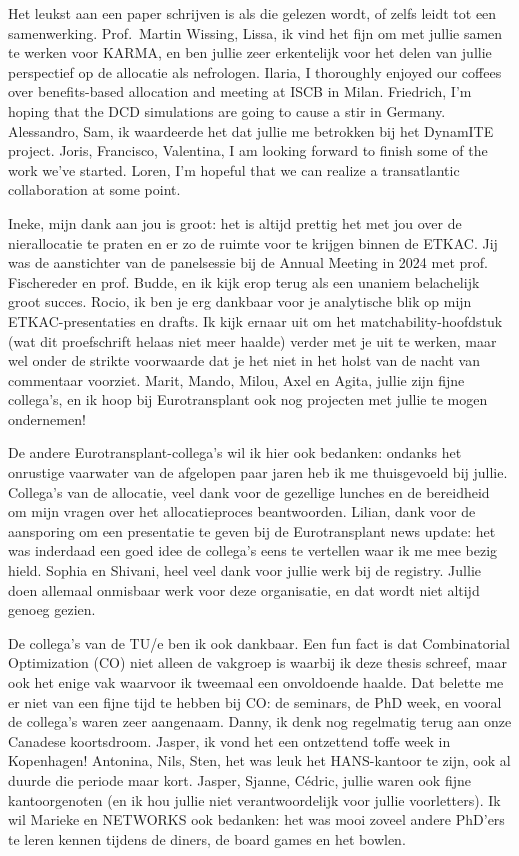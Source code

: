 \documentclass[11pt,twoside,]{book}
\begin{document}
Het leukst aan een paper schrijven is als die gelezen wordt, of zelfs
leidt tot een samenwerking. Prof.~Martin Wissing, Lissa,
ik vind het fijn om met jullie samen te werken voor KARMA, en ben jullie
zeer erkentelijk voor het delen van jullie perspectief op de allocatie als nefrologen.
Ilaria, I thoroughly enjoyed our coffees over benefits-based allocation and meeting
at ISCB in Milan. Friedrich, I'm hoping that the DCD simulations are going to
cause a stir in Germany. Alessandro, Sam, ik waardeerde het dat jullie me betrokken
bij het DynamITE project. Joris, Francisco, Valentina, I am looking forward to finish some
of the work we've started. Loren, I'm hopeful that we can
realize a transatlantic collaboration at some point.

Ineke, mijn dank aan jou is groot: het is altijd prettig het met jou over
de nierallocatie te praten en er zo de ruimte voor te krijgen binnen de ETKAC.
Jij was de aanstichter van de panelsessie bij de Annual Meeting in 2024 met
prof. Fischereder en prof. Budde, en ik kijk erop terug als een unaniem belachelijk
groot succes. Rocio, ik ben je erg dankbaar voor je analytische blik op
mijn ETKAC-presentaties en drafts. Ik kijk ernaar uit om het matchability-hoofdstuk
(wat dit proefschrift helaas niet meer haalde) verder met je uit te werken,
maar wel onder de strikte voorwaarde dat je het niet in het holst van de nacht
van commentaar voorziet.
Marit, Mando, Milou, Axel en Agita, jullie zijn fijne collega's, en ik hoop bij
Eurotransplant ook nog projecten met jullie te mogen ondernemen!

\newpage
De andere Eurotransplant-collega's wil ik hier ook bedanken: ondanks
het onrustige vaarwater van de afgelopen paar jaren heb ik me thuisgevoeld bij
jullie. Collega's van de allocatie, veel dank voor de gezellige lunches
en de bereidheid om mijn vragen over het allocatieproces beantwoorden. Lilian, dank
voor de aansporing om een presentatie te geven bij de Eurotransplant news update:
het was inderdaad een goed idee de collega's eens te vertellen waar ik me
mee bezig hield. Sophia en Shivani, heel veel dank voor jullie werk bij de registry.
Jullie doen allemaal onmisbaar werk
voor deze organisatie, en dat wordt niet altijd genoeg gezien.

De collega's van de TU/e ben ik ook dankbaar. Een fun fact is dat
Combinatorial Optimization (CO) niet alleen de vakgroep is waarbij ik deze
thesis schreef, maar ook het enige vak waarvoor ik tweemaal
een onvoldoende haalde. Dat belette me er niet van een fijne tijd te hebben
bij CO: de seminars, de PhD week, en vooral de collega's waren zeer aangenaam.
Danny, ik denk nog regelmatig terug aan onze Canadese koortsdroom. Jasper, ik
vond het een ontzettend toffe week in Kopenhagen! Antonina, Nils, Sten, het was
leuk het HANS-kantoor te zijn, ook al duurde die periode maar kort. Jasper, Sjanne,
Cédric, jullie waren ook fijne kantoorgenoten (en ik hou jullie niet verantwoordelijk
voor jullie voorletters). Ik wil Marieke en NETWORKS ook bedanken: het was mooi zoveel
andere PhD'ers te leren kennen tijdens de diners, de board games en het bowlen.
\end{document}
